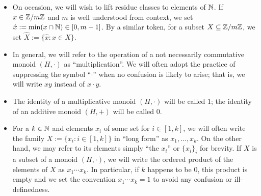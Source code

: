 \begin{itemize}
	\item On occasion, we will wish to lift residue classes to elements of $\mathbb{N}$.  
	If $x\in \mathbb{Z}/m\mathbb{Z}$ and $m$ is well understood from context, we set $\hat{x} := \min(x\cap \mathbb{N}) \in [0,m-1]$.
	By a similar token, for a subset $X\subseteq \mathbb{Z}/m\mathbb{Z}$, we set $\hat{X} := \{\hat{x}: x\in X\}$.
	
	\item In general, we will refer to the operation of a not necessarily commutative monoid $(H,\cdot)$ as ``multiplication''.
	We will often adopt the practice of suppressing the symbol ``$\cdot$'' when no confusion is likely to arise; that is, we will write $xy$ instead of $x\cdot y$.
	
	\item The identity of a multiplicative monoid $(H,\cdot)$ will be called $1$; the identity of an additive monoid $(H,+)$ will be called $0$.
	
	\item For a $k\in \mathbb{N}$ and elements $x_i$ of some set for $i\in [1,k]$, we will often write the family $X:=\{x_i: i\in [1,k]\}$ in ``long form'' as $x_1,\dots,x_k$.
	On the other hand, we may refer to its elements simply ``the $x_i$'' or $\{x_i\}_i$ for brevity.
	If $X$ is a subset of a monoid $(H,\cdot)$, we will write the ordered product of the elements of $X$ as $x_1\cdots x_k$.
	In particular, if $k$ happens to be $0$, this product is empty and we set the convention $x_1\cdots x_k = 1$ to avoid any confusion or ill-definedness.
\end{itemize}




